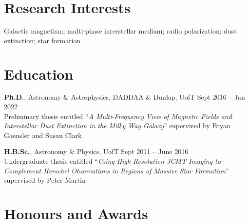 \documentclass[10pt]{res} %
\begin{document}
\begin{resume}


\section{\Large Research Interests}
\vspace{-5pt} %
\noindent\makebox[\linewidth]{\rule{\textwidth}{0.4pt}}
\vspace{-20pt} %

Galactic magnetism; multi-phase interstellar medium; radio polarization; dust extinction; star formation


\section{\Large Education}
\vspace{-5pt} %
\noindent\makebox[\linewidth]{\rule{\textwidth}{0.4pt}}
\vspace{-20pt} %

{\bf Ph.D.}, Astronomy \& Astrophysics, DADDAA \& Dunlap, UofT \hfill Sept 2016 -- Jan 2022 \\
Preliminary thesis entitled ``\textit{A Multi-Frequency View of Magnetic Fields and Interstellar Dust Extinction in the Milky Way Galaxy}'' supervised by Bryan Gaensler and Susan Clark

{\bf H.B.Sc.}, Astronomy \& Physics, UofT \hfill Sept 2011 -- June 2016 \\ 
Undergraduate thesis entitled ``\textit{Using High-Resolution JCMT Imaging to Complement Herschel Observations in Regions of Massive Star Formation}'' supervised by Peter Martin
 

\section{\Large Honours and Awards}
\vspace{-5pt} %
\noindent\makebox[\linewidth]{\rule{\textwidth}{0.4pt}}
\vspace{-20pt} %


\end{resume}
\end{document}
